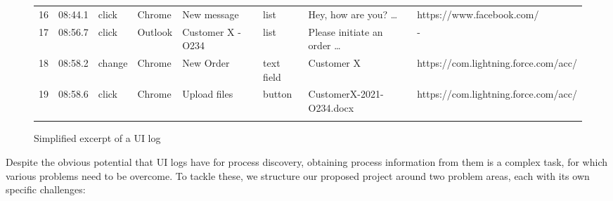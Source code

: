 \begin{figure}[b!]
\begin{adjustbox}{max width=\textwidth}
\begin{tabular}{llllllll}
16&08:44.1&click&Chrome&New message&list&Hey, how are you? …&https://www.facebook.com/\\\noalign{\smallskip}
17&08:56.7&click&Outlook&Customer X - O234&list&Please initiate an order …&-\\\noalign{\smallskip}
18&08:58.2&change&Chrome&New Order&text field&Customer X&https://com.lightning.force.com/acc/\\\noalign{\smallskip}
19&08:58.6&click&Chrome&Upload files&button&CustomerX-2021-O234.docx&https://com.lightning.force.com/acc/\\\noalign{\smallskip}
\hline\noalign{\smallskip}
\end{tabular}
\end{adjustbox}
\vspace{-1em}
\caption{Simplified excerpt of a UI log}
\label{fig:example}
\end{figure}

Despite the obvious potential that UI logs have for process discovery, obtaining process information from them is a complex task, for which various problems need to be overcome. To tackle these, we structure our proposed project around two problem areas, each with its own specific challenges:

